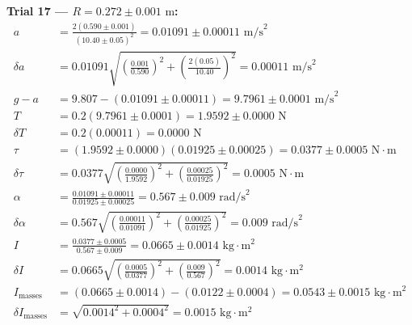 \documentclass[11pt]{article}
\begin{document}
\textbf{Trial 17 — $R = 0.272 \pm 0.001\text{ m}$:}
\begin{align*}
a &= \frac{2(0.590 \pm 0.001)}{(10.40 \pm 0.05)^2} = 0.01091 \pm 0.00011\text{ m/s}^2 \\
\delta a &= 0.01091\sqrt{\left(\frac{0.001}{0.590}\right)^2 + \left(\frac{2(0.05)}{10.40}\right)^2} = 0.00011\text{ m/s}^2 \\
g - a &= 9.807 - (0.01091 \pm 0.00011) = 9.7961 \pm 0.0001\text{ m/s}^2 \\
T &= 0.2(9.7961 \pm 0.0001) = 1.9592 \pm 0.0000\text{ N} \\
\delta T &= 0.2(0.00011) = 0.0000\text{ N} \\
\tau &= (1.9592 \pm 0.0000)(0.01925 \pm 0.00025) = 0.0377 \pm 0.0005\text{ N}\cdot\text{m} \\
\delta\tau &= 0.0377\sqrt{\left(\frac{0.0000}{1.9592}\right)^2 + \left(\frac{0.00025}{0.01925}\right)^2} = 0.0005\text{ N}\cdot\text{m} \\
\alpha &= \frac{0.01091 \pm 0.00011}{0.01925 \pm 0.00025} = 0.567 \pm 0.009\text{ rad/s}^2 \\
\delta\alpha &= 0.567\sqrt{\left(\frac{0.00011}{0.01091}\right)^2 + \left(\frac{0.00025}{0.01925}\right)^2} = 0.009\text{ rad/s}^2 \\
I &= \frac{0.0377 \pm 0.0005}{0.567 \pm 0.009} = 0.0665 \pm 0.0014\text{ kg}\cdot\text{m}^2 \\
\delta I &= 0.0665\sqrt{\left(\frac{0.0005}{0.0377}\right)^2 + \left(\frac{0.009}{0.567}\right)^2} = 0.0014\text{ kg}\cdot\text{m}^2 \\
I_{\text{masses}} &= (0.0665 \pm 0.0014) - (0.0122 \pm 0.0004) = 0.0543 \pm 0.0015\text{ kg}\cdot\text{m}^2 \\
\delta I_{\text{masses}} &= \sqrt{0.0014^2 + 0.0004^2} = 0.0015\text{ kg}\cdot\text{m}^2
\end{align*}
\end{document}
